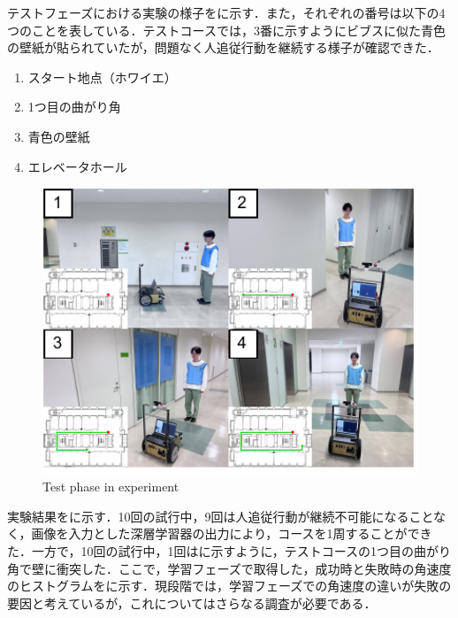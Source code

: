   テストフェーズにおける実験の様子をに示す．また，それぞれの番号は以下の4つのことを表している．テストコースでは，3番に示すようにビブスに似た青色の壁紙が貼られていたが，問題なく人追従行動を継続する様子が確認できた．

  \begin{enumerate}
    \item スタート地点（ホワイエ）
    \item 1つ目の曲がり角
    \item 青色の壁紙
    \item エレベータホール
  \end{enumerate}

\vspace{1cm}

  \begin{figure}[h]
    \centering
    \includegraphics[width=13cm] {images/pdf/RobotGuidance_exp_test_phase}
    \captionsetup{justification=raggedright} %
    \caption{Test phase in experiment}
    \label{Fig:Following phase in experiment}
  \end{figure}

\newpage

  実験結果をに示す．10回の試行中，9回は人追従行動が継続不可能になることなく，画像を入力とした深層学習器の出力により，コースを1周することができた．一方で，10回の試行中，1回はに示すように，テストコースの1つ目の曲がり角で壁に衝突した．ここで，学習フェーズで取得した，成功時と失敗時の角速度のヒストグラムをに示す．現段階では，学習フェーズでの角速度の違いが失敗の要因と考えているが，これについてはさらなる調査が必要である．


